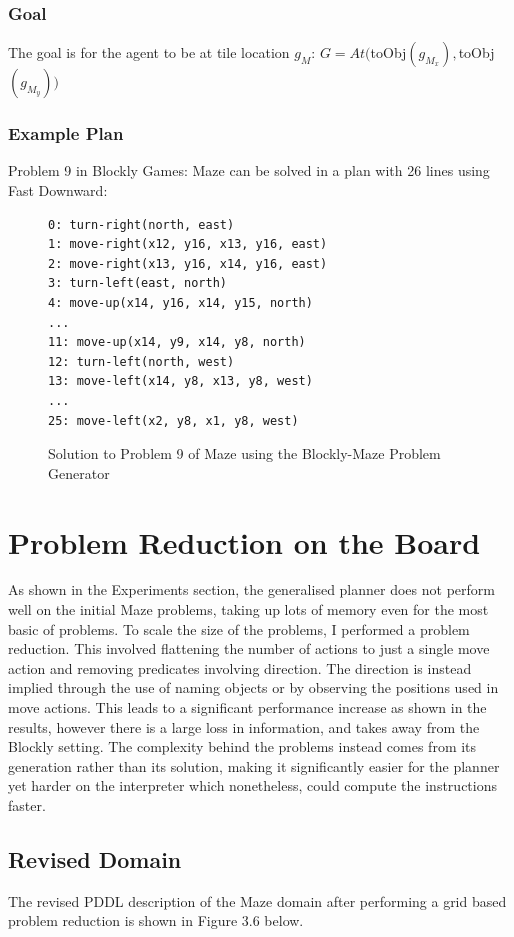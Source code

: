 \subsubsection{Goal}
The goal is for the agent to be at tile location $g_M$: $G = At($toObj$(g_{M_x}), $toObj$(g_{M_y}))$

\newpage
\subsubsection{Example Plan}
Problem 9 in Blockly Games: Maze can be solved in a plan with 26 lines using Fast Downward:

\begin{figure}[h!]
\centering
\begin{BVerbatim}
0: turn-right(north, east)
1: move-right(x12, y16, x13, y16, east)
2: move-right(x13, y16, x14, y16, east)
3: turn-left(east, north)
4: move-up(x14, y16, x14, y15, north)
...
11: move-up(x14, y9, x14, y8, north)
12: turn-left(north, west)
13: move-left(x14, y8, x13, y8, west)
...
25: move-left(x2, y8, x1, y8, west)
\end{BVerbatim}
\caption{Solution to Problem 9 of Maze using the Blockly-Maze Problem Generator}
\end{figure}



\section{Problem Reduction on the Board}
As shown in the Experiments section, the generalised planner does not perform well on the initial Maze problems, taking up lots of memory even for the most basic of problems. To scale the size of the problems, I performed a problem reduction. This involved flattening the number of actions to just a single move action and removing predicates involving direction. The direction is instead implied through the use of naming objects or by observing the positions used in move actions. This leads to a significant performance increase as shown in the results, however there is a large loss in information, and takes away from the Blockly setting. The complexity behind the problems instead comes from its generation rather than its solution, making it significantly easier for the planner yet harder on the interpreter which nonetheless, could compute the instructions faster.

\subsection{Revised Domain}
The revised PDDL description of the Maze domain after performing a grid based problem reduction is shown in Figure 3.6 below.

